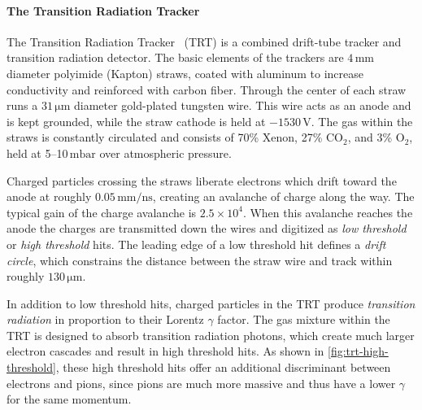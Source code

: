 \paragraph{The Transition Radiation Tracker}
The Transition Radiation Tracker~\cite{atlas-trt,atlas-trt2} (TRT) is a combined drift-tube tracker and transition radiation detector.
The basic elements of the trackers are $4\,\mathrm{mm}$ diameter polyimide (Kapton) straws, coated with aluminum to increase conductivity and reinforced with carbon fiber.
Through the center of each straw runs a $31\,\mathrm{\mu m}$ diameter gold-plated tungsten wire.
This wire acts as an anode and is kept grounded, while the straw cathode is held at $-1530\,\mathrm{V}$.
The gas within the straws is constantly circulated and consists of 70\% Xenon, 27\% CO$_2$, and 3\% O$_2$, held at 5--10$\,\mathrm{mbar}$ over atmospheric pressure.

Charged particles crossing the straws liberate electrons which drift toward the anode at roughly $0.05\,\mathrm{mm/ns}$, creating an avalanche of charge along the way.
The typical gain of the charge avalanche is $2.5 \times 10^4$.
When this avalanche reaches the anode the charges are transmitted down the wires and digitized as \emph{low threshold} or \emph{high threshold} hits.
The leading edge of a low threshold hit defines a \emph{drift circle}, which constrains the distance between the straw wire and track within roughly $130\,\mathrm{\mu m}$.

\begin{cfig}
  \caption[TRT high threshold probability for $e$, $\mu$, and pions]{
    Probability of a high-threshold hit in the TRT barrel section as a function of the $\gamma$ for $e$ (open squares), $\mu$ (full triangles) and pions (open circles) in the energy range 2--350$\,\gev$, as measured in the combined test-beam.}
  \label{fig:trt-high-threshold}
\end{cfig}

In addition to low threshold hits, charged particles in the TRT produce \emph{transition radiation} in proportion to their Lorentz $\gamma$ factor.
The gas mixture within the TRT is designed to absorb transition radiation photons, which create much larger electron cascades and result in high threshold hits.
As shown in \cref{fig:trt-high-threshold}, these high threshold hits offer an additional discriminant between electrons and pions, since pions are much more massive and thus have a lower $\gamma$ for the same momentum.

